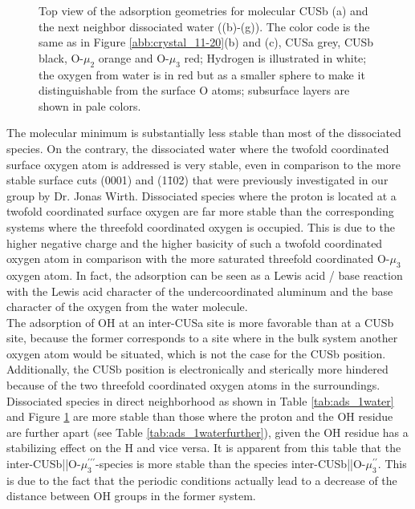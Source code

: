 \documentclass[11pt,DIV=13,BCOR=5mm,a4paper,headinclude]{scrbook}
\begin{document}
\begin{figure}[!ht]
 \caption{Top view of the adsorption geometries for molecular CUSb (a) and the next neighbor dissociated water 
((b)-(g)).
The color code is the same as in Figure \ref{abb:crystal_11-20}(b) and (c), CUSa grey, CUSb black, O-$\mu_2$ orange and O-$\mu_3$ red; Hydrogen is illustrated in white; the oxygen from water is in red but as a smaller sphere to make it distinguishable from the surface O atoms; subsurface layers are shown in pale colors.}
        \label{abb:ads-geoms}
 \end{figure}

The molecular minimum is substantially less stable than most of the dissociated species.
On the contrary, the dissociated water where the twofold coordinated surface oxygen atom is addressed is very stable, even in comparison to the more stable surface cuts (0001) and (1\=102) that were previously investigated in our group by Dr. Jonas Wirth\cite{Wirth2016,WirthJPCC2012}.
Dissociated species where the proton is located at a twofold coordinated surface oxygen are far more stable than the corresponding systems where the threefold coordinated oxygen is occupied.
This is due to the higher negative charge and the higher basicity of such a twofold coordinated oxygen atom in comparison with the more saturated threefold coordinated O-$\mu_3$ oxygen atom.
In fact, the adsorption can be seen as a Lewis acid / base reaction\cite{Stair1981} with the Lewis acid character of the undercoordinated aluminum and the base character of the oxygen from the water molecule.
\\
The adsorption of OH at an inter-CUSa site is more favorable than at a CUSb site, because the former corresponds to a site where in the bulk system another oxygen atom would be situated, which is not the case for the CUSb position.
Additionally, the CUSb position is electronically and sterically more hindered because of the two threefold coordinated oxygen atoms in the surroundings.
\\
Dissociated species in direct neighborhood as shown in Table \ref{tab:ads_1water} and Figure \ref{abb:ads-geoms} are more stable than those where the proton and the OH residue are further apart (see Table \ref{tab:ads_1waterfurther}), given the OH residue has a stabilizing effect on the H and vice versa.
It is apparent from this table that the inter-CUSb||O-$\mu_3^{\prime\prime\prime}$-species is more stable than the species inter-CUSb||O-$\mu_3^{\prime\prime}$.
This is due to the fact that the periodic conditions actually lead to a decrease of the distance between OH groups in the former system.
\end{document}

